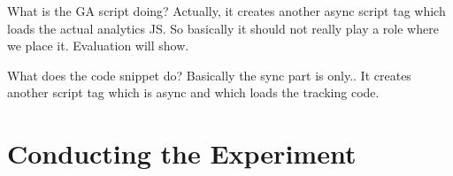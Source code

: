 




What is the GA script doing?
Actually, it creates another async script tag which loads the actual analytics JS.
So basically it should not really play a role where we place it.
Evaluation will show.

What does the code snippet do?
Basically the sync part is only..
It creates another script tag which is async and which loads the tracking code.









\section{Conducting the Experiment}







